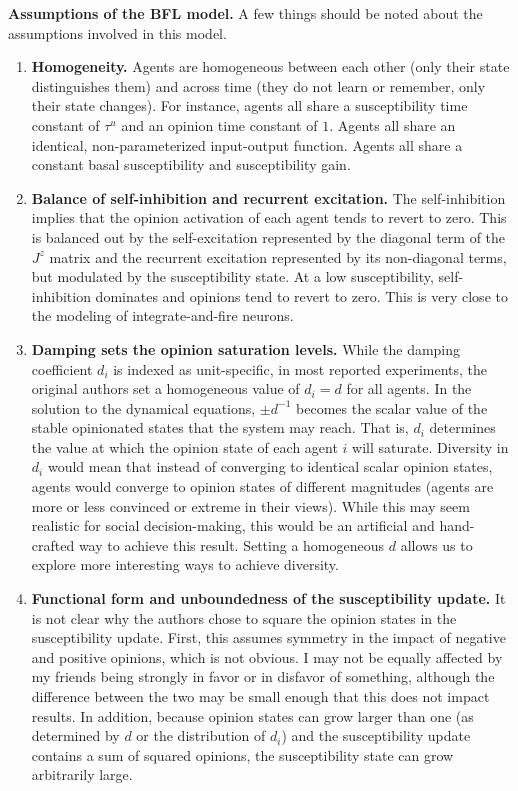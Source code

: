 \documentclass[]{article}
\begin{document}
\textbf{Assumptions of the BFL model.} A few things should be noted about the assumptions involved in this model.
\begin{enumerate}
	\item \textbf{Homogeneity.} Agents are homogeneous between each other (only their state distinguishes them) and across time (they do not learn or remember, only their state changes). For instance, agents all share a susceptibility time constant of $\tau^u$ and an opinion time constant of $1$. Agents all share an identical, non-parameterized input-output function. Agents all share a constant basal susceptibility and susceptibility gain. 
	\item \textbf{Balance of self-inhibition and recurrent excitation.} The self-inhibition implies that the opinion activation of each agent tends to revert to zero. This is balanced out by the self-excitation represented by the diagonal term of the $J^z$ matrix and the recurrent excitation represented by its non-diagonal terms, but modulated by the susceptibility state. At a low susceptibility, self-inhibition dominates and opinions tend to revert to zero. This is very close to the modeling of integrate-and-fire neurons.
	\item \textbf{Damping sets the opinion saturation levels.} While the damping coefficient $d_i$ is indexed as unit-specific, in most reported experiments, the original authors set a homogeneous value of $d_i=d$ for all agents. In the solution to the dynamical equations, $\pm d^{-1}$ becomes the scalar value of the stable opinionated states that the system may reach. That is, $d_i$ determines the value at which the opinion state of each agent $i$ will saturate. Diversity in $d_i$ would mean that instead of converging to identical scalar opinion states, agents would converge to opinion states of different magnitudes (agents are more or less convinced or extreme in their views). While this may seem realistic for social decision-making, this would be an artificial and hand-crafted way to achieve this result. Setting a homogeneous $d$ allows us to explore more interesting ways to achieve diversity.
	\item \textbf{Functional form and unboundedness of the susceptibility update.} It is not clear why the authors chose to square the opinion states in the susceptibility update. First, this assumes symmetry in the impact of negative and positive opinions, which is not obvious. I may not be equally affected by my friends being strongly in favor or in disfavor of something, although the difference between the two may be small enough that this does not impact results. In addition, because opinion states can grow larger than one (as determined by $d$ or the distribution of $d_i$) and the susceptibility update contains a sum of squared opinions, the susceptibility state can grow arbitrarily large.
\end{enumerate}
\end{document}
